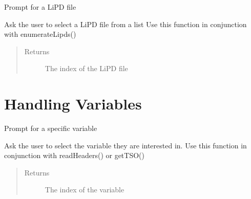 \documentclass[letterpaper,10pt,english]{sphinxmanual}
\begin{document}
\begin{fulllineitems}
\label{\detokenize{LipdUtils:pyleoclim.LipdUtils.promptForLipd}}
Prompt for a LiPD file

Ask the user to select a LiPD file from a list
Use this function in conjunction with enumerateLipds()
\begin{quote}\begin{description}
\item[{Returns}] \leavevmode
The index of the LiPD file

\end{description}\end{quote}

\end{fulllineitems}



\section{Handling Variables}
\label{\detokenize{LipdUtils:handling-variables}}

\begin{fulllineitems}
\label{\detokenize{LipdUtils:pyleoclim.LipdUtils.promptForVariable}}
Prompt for a specific variable

Ask the user to select the variable they are interested in.
Use this function in conjunction with readHeaders() or getTSO()
\begin{quote}\begin{description}
\item[{Returns}] \leavevmode
The index of the variable

\end{description}\end{quote}

\end{fulllineitems}

\end{document}
